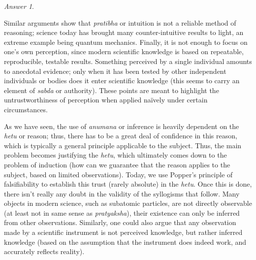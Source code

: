 \documentclass[11pt]{article}
\theoremstyle{remark}
\newtheorem*{answer}{Answer}
\begin{document}
\begin{answer}
        \begin{center}
        \hspace{1cm}
        \end{center}

        Similar arguments show that \emph{pratibha} or intuition is not a reliable
        method of reasoning; science today has brought many counter-intuitive results
        to light, an extreme example being quantum mechanics. Finally, it is not
        enough to focus on one's own perception, since modern scientific knowledge is
        based on repeatable, reproducible, testable results. Something perceived by a
        single individual amounts to anecdotal evidence; only when it has been tested
        by other independent individuals or bodies does it enter scientific knowledge
        (this seems to carry an element of \emph{sabda} or authority). These points
        are meant to highlight the untrustworthiness of perception when applied
        na\"ively under certain circumstances. 

        As we have seen, the use of \emph{anumana} or inference is heavily dependent
        on the \emph{hetu} or reason; thus, there has to be a great deal of
        confidence in this reason, which is typically a general principle applicable
        to the subject. Thus, the main problem becomes justifying the \emph{hetu},
        which ultimately comes down to the problem of induction (how can we guarantee
        that the reason applies to the subject, based on limited observations).
        Today, we use Popper's principle of falsifiability to establish this trust
        (rarely absolute) in the \emph{hetu}. Once this is done, there isn't really
        any doubt in the validity of the syllogisms that follow. Many objects in
        modern science, such as subatomic particles, are not directly observable (at
        least not in same sense as \emph{pratyaksha}), their existence can only be
        inferred from other observations. Similarly, one could also argue that any
        observation made by a scientific instrument is not perceived knowledge, but
        rather inferred knowledge (based on the assumption that the instrument does
        indeed work, and accurately reflects reality).


\end{answer}
\end{document}
